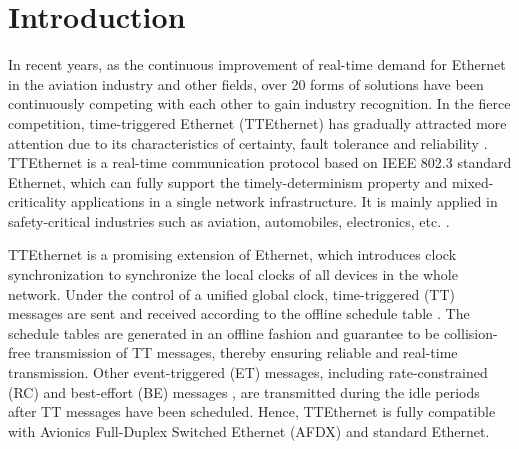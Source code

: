 \documentclass[electronics,article,accept,moreauthors,pdftex]{Definitions/mdpi}
\begin{document}


\section{Introduction}
\label{intro}
In recent years, as the continuous improvement of real-time demand for Ethernet in the aviation industry and other fields, over 20 forms of solutions have been continuously competing with each other to gain industry recognition. In the fierce competition, time-triggered Ethernet (TTEthernet) has gradually attracted more attention due to its characteristics of certainty, fault tolerance and reliability \cite{steiner2009ttethernet}. TTEthernet is a real-time communication protocol based on IEEE 802.3 standard Ethernet, which can fully support the timely-determinism property and mixed-criticality applications in a single network infrastructure. It is mainly applied in safety-critical industries such as aviation, automobiles, electronics, etc. \cite{steiner2018time}.

TTEthernet is a promising extension of Ethernet, which introduces clock synchronization to synchronize the local clocks of all devices in the whole network. Under the control of a unified global clock, time-triggered (TT) messages are sent and received according to the offline schedule table \cite{kopetz2005time}. The schedule tables are generated in an offline fashion and guarantee to be collision-free transmission of TT messages, thereby ensuring reliable and real-time transmission. Other event-triggered (ET) messages, including rate-constrained (RC) and best-effort (BE) messages \cite{TT}, are transmitted during the idle periods after TT messages have been scheduled. Hence, TTEthernet is fully compatible with Avionics Full-Duplex Switched Ethernet (AFDX) and standard Ethernet.
\end{document}
